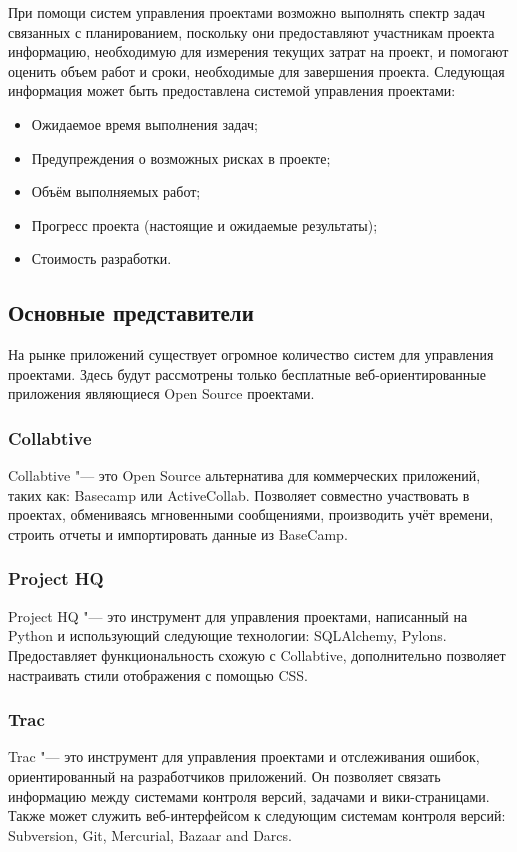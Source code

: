 При помощи систем управления проектами возможно выполнять спектр задач
связанных с планированием, поскольку они предоставляют участникам проекта
информацию, необходимую для измерения текущих затрат на проект, и помогают
оценить объем работ и сроки, необходимые для завершения проекта. Следующая
информация может быть предоставлена системой управления проектами:
\begin{itemize}
  \item Ожидаемое время выполнения задач;
  \item Предупреждения о возможных рисках в проекте;
  \item Объём выполняемых работ;
  \item Прогресс проекта (настоящие и ожидаемые результаты);
  \item Стоимость разработки.
\end{itemize}


\subsection{Основные представители}
На рынке приложений существует огромное количество систем для управления
проектами. Здесь будут рассмотрены только бесплатные веб-ориентированные
приложения являющиеся Open Source проектами.

\subsubsection{Collabtive}
Collabtive "--- это Open Source альтернатива для коммерческих приложений, таких
как: Basecamp или ActiveCollab. Позволяет совместно участвовать в
проектах, обмениваясь мгновенными сообщениями, производить учёт времени,
строить отчеты и импортировать данные из BaseCamp.

\subsubsection{Project HQ}
Project HQ "--- это инструмент для управления проектами, написанный на Python и
использующий следующие технологии: SQLAlchemy, Pylons. Предоставляет
функциональность схожую с Collabtive, дополнительно позволяет настраивать стили
отображения с помощью CSS.

\subsubsection{Trac}
Trac "--- это инструмент для управления проектами и отслеживания ошибок,
ориентированный на разработчиков приложений. Он позволяет связать информацию
между системами контроля версий, задачами и вики-страницами. Также может
служить веб-интерфейсом к следующим системам контроля версий: Subversion, Git,
Mercurial, Bazaar and Darcs.


